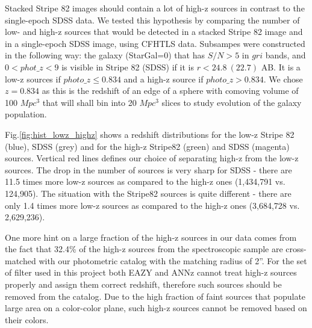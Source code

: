 \documentclass[apj,iop]{emulateapj}
\begin{document}
Stacked Stripe 82 images should contain a lot of high-z sources in contrast to the single-epoch SDSS data. We tested this hypothesis by comparing the number of low- and high-z sources that would be detected in a stacked Stripe 82 image and in a single-epoch SDSS image, using CFHTLS data. Subsampes were constructed in the following way: the galaxy (StarGal=0) that has $S/N>5$ in $gri$ bands, and $0<phot\_z <9$ is visible in Stripe 82 (SDSS) if it is $r<24.8\ (22.7)$ AB. It is a low-z sources if $photo\_z\leq0.834$ and a high-z source if $photo\_z>0.834$. We chose $z=0.834$ as this is the redshift of an edge of a sphere with comoving volume of 100 $Mpc^3$ that will shall bin into 20 $Mpc^3$ slices to study evolution of the galaxy population.

Fig.\ref{fig:hist_lowz_highz} shows a redshift distributions for the low-z Stripe 82 (blue), SDSS (grey) and for the high-z Stripe82 (green) and SDSS (magenta) sources. Vertical red lines defines our choice of separating high-z from the low-z sources. The drop in the number of sources is very sharp for SDSS - there are 11.5 times more low-z sources as compared to the high-z ones (1,434,791 vs. 124,905). The situation with the Stripe82 sources is quite different - there are only 1.4 times more low-z sources as compared to the high-z ones (3,684,728 vs. 2,629,236).

One more hint on a large fraction of the high-z sources in our data comes from the fact that 32.4\% of the high-z sources from the spectroscopic sample are cross-matched with our photometric catalog with the matching radius of 2''.
For the set of filter used in this project both EAZY and ANNz cannot treat high-z sources properly and assign them correct redshift, therefore such sources should be removed from the catalog. Due to the high fraction of faint sources that populate large area on a color-color plane, such high-z sources cannot be removed based on their colors.
\end{document}
